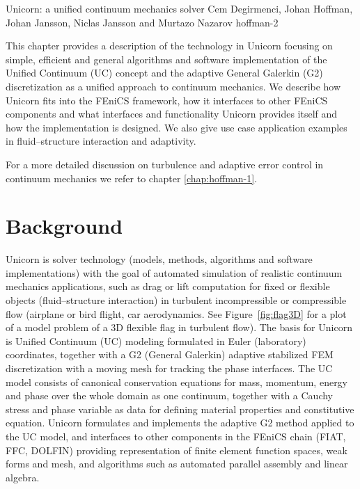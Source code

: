               {Unicorn: a unified continuum mechanics solver}
              {Cem Degirmenci, Johan Hoffman, Johan Jansson, Niclas Jansson and Murtazo Nazarov}
              {hoffman-2}

This chapter provides a description of the technology in Unicorn
focusing on simple, efficient and general algorithms and software
implementation of the Unified Continuum (UC) concept and the adaptive
General Galerkin (G2) discretization as a unified approach to
continuum mechanics. We describe how Unicorn fits into the FEniCS
framework, how it interfaces to other FEniCS components and what
interfaces and functionality Unicorn provides itself and how the
implementation is designed. We also give use case application examples
in fluid--structure interaction and adaptivity.

For a more detailed discussion on turbulence and adaptive error
control in continuum mechanics we refer to
chapter \ref{chap:hoffman-1}.


\section{Background}

Unicorn is solver technology (models, methods, algorithms and software
implementations) with the goal of automated simulation of realistic
continuum mechanics applications, such as drag or lift computation for
fixed or flexible objects (fluid--structure interaction) in turbulent
incompressible or compressible flow (airplane or bird flight, car
aerodynamics. See Figure~\ref{fig:flag3D} for a plot of a model
problem of a 3D flexible flag in turbulent flow). The basis for
Unicorn is Unified Continuum (UC) modeling formulated in Euler
(laboratory) coordinates, together with a G2 (General Galerkin)
adaptive stabilized FEM discretization with a moving mesh for tracking
the phase interfaces. The UC model consists of canonical conservation
equations for mass, momentum, energy and phase over the whole domain
as one continuum, together with a Cauchy stress and phase variable as
data for defining material properties and constitutive
equation. Unicorn formulates and implements the adaptive G2 method
applied to the UC model, and interfaces to other components in the
FEniCS chain (FIAT, FFC, DOLFIN) providing representation of finite
element function spaces, weak forms and mesh, and algorithms such as
automated parallel assembly and linear algebra.

